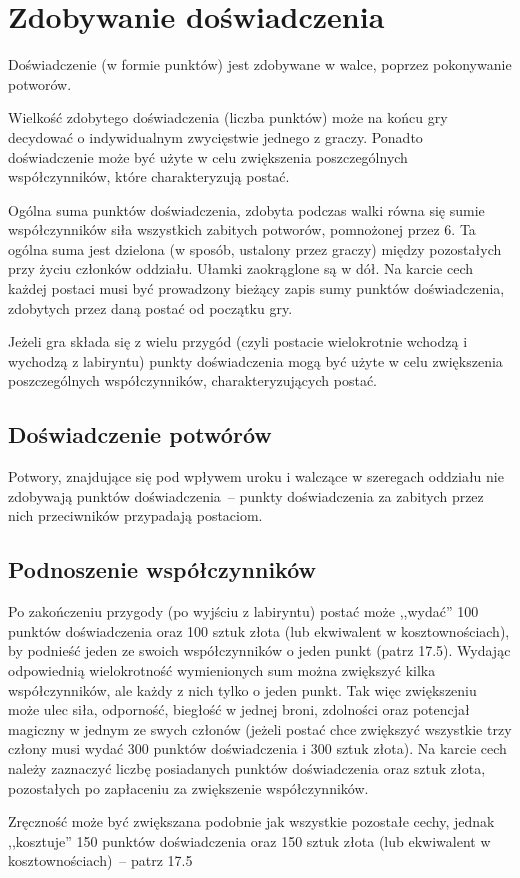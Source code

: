 \section{Zdobywanie doświadczenia}

Doświadczenie (w formie punktów) jest zdobywane w walce, poprzez pokonywanie potworów.

Wielkość zdobytego doświadczenia (liczba punktów) może na końcu gry decydować o indywidualnym zwycięstwie jednego z graczy.
Ponadto doświadczenie może być użyte w celu zwiększenia poszczególnych współczynników, które charakteryzują postać.

Ogólna suma punktów doświadczenia, zdobyta podczas walki równa się sumie współczynników siła wszystkich zabitych potworów, pomnożonej przez 6.
Ta ogólna suma jest dzielona (w sposób, ustalony przez graczy) między pozostałych przy życiu członków oddziału.
Ułamki zaokrąglone są w dół.
Na karcie cech każdej postaci musi być prowadzony bieżący zapis sumy punktów doświadczenia, zdobytych przez daną postać od początku gry.

Jeżeli gra składa się z wielu przygód (czyli postacie wielokrotnie wchodzą i wychodzą z labiryntu) punkty doświadczenia mogą być użyte w celu zwiększenia poszczególnych współczynników, charakteryzujących postać.

\subsection{Doświadczenie potwórów}

Potwory, znajdujące się pod wpływem uroku i walczące w szeregach oddziału nie zdobywają punktów doświadczenia~-- punkty doświadczenia za zabitych przez nich przeciwników przypadają postaciom.

\subsection{Podnoszenie współczynników}

Po zakończeniu przygody (po wyjściu z labiryntu) postać może ,,wydać'' 100 punktów doświadczenia oraz 100 sztuk złota (lub ekwiwalent w kosztownościach), by podnieść jeden ze swoich współczynników o jeden punkt (patrz 17.5).
Wydając odpowiednią wielokrotność wymienionych sum można zwiększyć kilka współczynników, ale każdy z nich tylko o jeden punkt.
Tak więc zwiększeniu może ulec siła, odporność, biegłość w jednej broni, zdolności oraz potencjał magiczny w jednym ze swych członów (jeżeli postać chce zwiększyć wszystkie trzy człony musi wydać 300 punktów doświadczenia i 300 sztuk złota).
Na karcie cech należy zaznaczyć liczbę posiadanych punktów doświadczenia oraz sztuk złota, pozostałych po zapłaceniu za zwiększenie współczynników.

Zręczność może być zwiększana podobnie jak wszystkie pozostałe cechy, jednak ,,kosztuje'' 150 punktów doświadczenia oraz 150 sztuk złota (lub ekwiwalent w kosztownościach)~-- patrz 17.5

